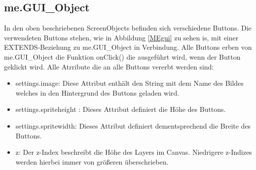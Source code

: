 \newpage
\subsection{me.GUI\_Object}
\label{GUI}
In den oben beschriebenen ScreenObjects befinden sich verschiedene Buttons. Die verwendeten Buttons stehen, wie in Abbildung \ref {MEgui} zu sehen is, mit einer EXTENDS-Beziehung
zu me.GUI\_Object in Verbindung. Alle Buttons erben von me.GUI\_Object die Funktion onClick() die ausgef\"uhrt wird, wenn der Button
geklickt wird. Alle Atrribute die an alle Buttons vererbt werden sind:
\begin{itemize} 
	\item settings.image: Diese Attribut enth\"alt den String mit dem Name des Bildes welches in den Hintergrund des Buttons geladen wird.
	\item settings.spriteheight : Dieses Attribut definiert die H\"ohe des Buttons.
  	\item settings.spritewidth: Dieses Attribut definiert dementsprechend die Breite des Buttons.
 	\item z: Der z-Index beschreibt die H\"ohe des Layers im Canvas. Niedrigere z-Indizes werden hierbei immer von gr\"o{\ss}eren \"uberschrieben.
\end{itemize}       
  
